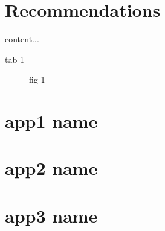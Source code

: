 \documentclass[12pt]{article}
\begin{document}
\section{Recommendations}


	\begin{table} [h]
		content...
		\caption{tab 1}
	\end{table}

	\begin{figure} [h]
		\caption{fig 1}
	\end{figure}
	
\pagebreak










\begin{appendices}


\cfoot{\thesection-\thepage}

\section{app1 name}

\pagebreak
\section{app2 name}

\pagebreak
\section{app3 name}




\pagebreak

\end{appendices}
\end{document}
